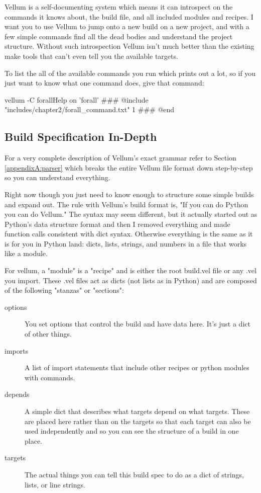 Vellum is a self-documenting system which means it can introspect on the
commands it knows about, the build file, and all included modules and recipes.
I want you to use Vellum to jump onto a new build on a new
project, and with a few simple commands find all the dead bodies and understand
the project structure.  Without such introspection Vellum isn't much better than
the existing make tools that can't even tell you the available targets.

To list the all of the available commands you run  which prints
out a lot, so if you just want to know what one command does, give that command:

\begin{code}{vellum -C forall}{Help on 'forall'}
### @include "includes/chapter2/forall_command.txt" 1
### @end
\end{code}



\subsection{Build Specification In-Depth}

For a very complete description of Vellum's exact grammar refer to Section
\ref{appendixA:parser} which breaks the entire Vellum  file
format down step-by-step so you can understand everything.  

Right now though you just need to know enough to structure some simple builds
and expand out.  The rule with Vellum's build format is, "If you can do Python
you can do Vellum."  The syntax may seem different, but it actually started out
as Python's data structure format and then I removed everything and made
function calls consistent with dict syntax.  Otherwise everything is the same as
it is for you in Python land:  dicts, lists, strings, and numbers in a file that
works like a module.

For vellum, a "module" is a "recipe" and is either the root build.vel file or
any .vel you import.  These .vel files act as dicts (not lists as in Python) and
are composed of the following "stanzas" or "sections":

\begin{description}
\item[options] You set options that control the build and have data here.  It's
just a dict of other things.
\item[imports] A list of import statements that include other recipes or python
modules with commands.
\item[depends] A simple dict that describes what targets depend on what targets.
These are placed here rather than on the targets so that each target can also be
used independently and so you can see the structure of a build in one place.
\item[targets] The actual things you can tell this build spec to do as a dict of
strings, lists, or line strings.
\end{description}

